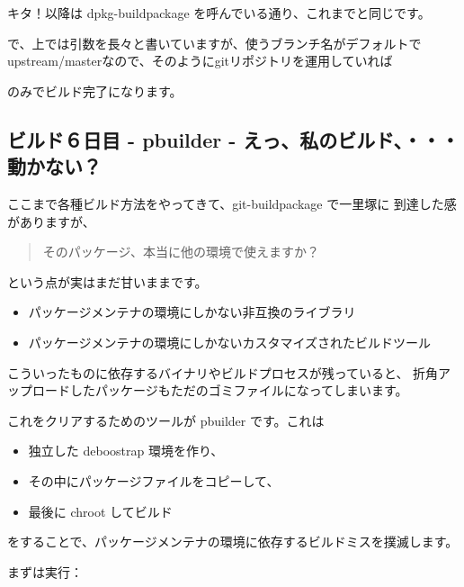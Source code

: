 \documentclass[mingoth,a4paper]{jsarticle}
\begin{document}
キタ！以降は dpkg-buildpackage を呼んでいる通り、これまでと同じです。

で、上では引数を長々と書いていますが、使うブランチ名がデフォルトで
upstream/masterなので、そのようにgitリポジトリを運用していれば


のみでビルド完了になります。

\subsection{ビルド６日目 - pbuilder - えっ、私のビルド、・・・動かない？}

ここまで各種ビルド方法をやってきて、git-buildpackage で一里塚に
到達した感がありますが、

\begin{quote}
\Large{そのパッケージ、本当に他の環境で使えますか？}
\end{quote}

という点が実はまだ甘いままです。

\begin{itemize}
\item パッケージメンテナの環境にしかない非互換のライブラリ
\item パッケージメンテナの環境にしかないカスタマイズされたビルドツール
\end{itemize}

こういったものに依存するバイナリやビルドプロセスが残っていると、
折角アップロードしたパッケージもただのゴミファイルになってしまいます。

これをクリアするためのツールが pbuilder です。これは

\begin{itemize}
\item 独立した deboostrap 環境を作り、
\item その中にパッケージファイルをコピーして、
\item 最後に chroot してビルド
\end{itemize}

をすることで、パッケージメンテナの環境に依存するビルドミスを撲滅します。

まずは実行：
\end{document}
